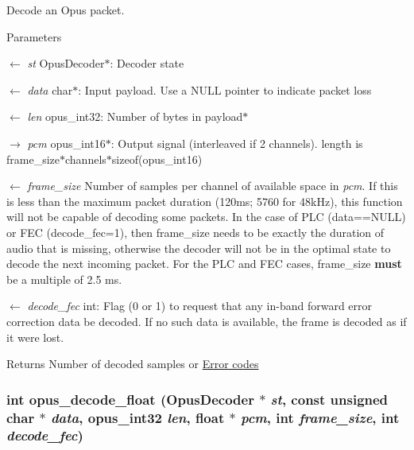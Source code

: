 Decode an Opus packet. 
\begin{DoxyParams}{Parameters}
\item[\mbox{$\leftarrow$} {\em st}]{\ttfamily OpusDecoder$\ast$}: Decoder state \item[\mbox{$\leftarrow$} {\em data}]{\ttfamily char$\ast$}: Input payload. Use a NULL pointer to indicate packet loss \item[\mbox{$\leftarrow$} {\em len}]{\ttfamily opus\_\-int32}: Number of bytes in payload$\ast$ \item[\mbox{$\rightarrow$} {\em pcm}]{\ttfamily opus\_\-int16$\ast$}: Output signal (interleaved if 2 channels). length is frame\_\-size$\ast$channels$\ast$sizeof(opus\_\-int16) \item[\mbox{$\leftarrow$} {\em frame\_\-size}]Number of samples per channel of available space in {\itshape pcm\/}. If this is less than the maximum packet duration (120ms; 5760 for 48kHz), this function will not be capable of decoding some packets. In the case of PLC (data==NULL) or FEC (decode\_\-fec=1), then frame\_\-size needs to be exactly the duration of audio that is missing, otherwise the decoder will not be in the optimal state to decode the next incoming packet. For the PLC and FEC cases, frame\_\-size {\bfseries must} be a multiple of 2.5 ms. \item[\mbox{$\leftarrow$} {\em decode\_\-fec}]{\ttfamily int}: Flag (0 or 1) to request that any in-\/band forward error correction data be decoded. If no such data is available, the frame is decoded as if it were lost. \end{DoxyParams}
\begin{DoxyReturn}{Returns}
Number of decoded samples or \hyperlink{group__opus__errorcodes}{Error codes} 
\end{DoxyReturn}
\hypertarget{group__opus__decoder_ga9c554b8c0214e24733a299fe53bb3bd2}{
\subsubsection[{opus\_\-decode\_\-float}]{\setlength{\rightskip}{0pt plus 5cm}int opus\_\-decode\_\-float ({\bf OpusDecoder} $\ast$ {\em st}, \/  const unsigned char $\ast$ {\em data}, \/  {\bf opus\_\-int32} {\em len}, \/  float $\ast$ {\em pcm}, \/  int {\em frame\_\-size}, \/  int {\em decode\_\-fec})}}
\label{group__opus__decoder_ga9c554b8c0214e24733a299fe53bb3bd2}


